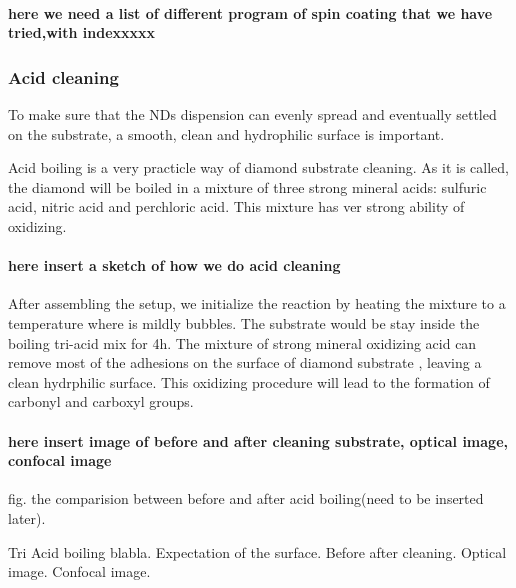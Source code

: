 \paragraph{here we need a list of different program of spin coating that we have tried,with indexxxxx}

\subsubsection{Acid cleaning}
To make sure that the NDs dispension can evenly spread and eventually settled on the substrate, a smooth, clean and hydrophilic surface is important.

Acid boiling is a very practicle way of diamond substrate cleaning. As it is called, the diamond will be boiled in a mixture of three strong mineral acids: sulfuric acid, nitric acid and perchloric acid. This mixture has ver strong ability of oxidizing.

\paragraph{here insert a sketch of how we do acid cleaning} 

After assembling the setup, we initialize the reaction by heating the mixture to a temperature where is mildly bubbles. The substrate would be stay inside the boiling tri-acid mix for 4h. 
The mixture of strong mineral oxidizing acid can remove most of the adhesions on the surface of diamond substrate , leaving a clean hydrphilic surface. This oxidizing procedure will lead to the formation of carbonyl and carboxyl groups.




\paragraph {here insert image of before and after cleaning substrate, optical image, confocal image }
fig. the comparision between before and after acid boiling(need to be inserted later).
 
Tri Acid boiling blabla. Expectation of the surface. Before after cleaning. Optical image. Confocal image.

